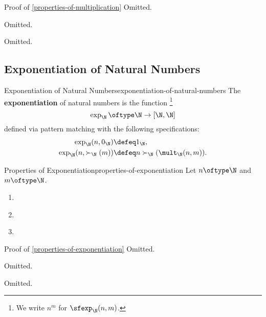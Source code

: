 \begin{Proof}{Proof of \cref{properties-of-multiplication}}%
    Omitted.

    Omitted.

    Omitted.
\end{Proof}
\subsection{Exponentiation of Natural Numbers}\label{subsection-martin-löf-type-theory-exponentiation-of-natural-numbers}
\begin{definition}{Exponentiation of Natural Numbers}{exponentiation-of-natural-numbers}%
    The \textbf{exponentiation} of natural numbers is the function%
    \footnote{%
        We write $n^{m}$ for $\sfexp_{\N}(n,m)$.
        \par\vspace*{\TCBBoxCorrection}
    }%
    \[
        \exp_{\N}%
        \oftype%
        \N%
        \to%
        [\N,\N]%
    \]%
    defined via pattern matching with the following specifications:%
    \begin{align*}
        \exp_{\N}(n,0_{\N})        &\defeq 1_{\N},\\
        \exp_{\N}(n,\succ_{\N}(m)) &\defeq n\succ_{\N}(\mult_{\N}(n,m)).%
    \end{align*}
\end{definition}
\begin{proposition}{Properties of Exponentiation}{properties-of-exponentiation}%
    Let $n\oftype\N$ and $m\oftype\N$.
    \begin{enumerate}
        \item\label{properties-of-exponentiation-unitality}
        \item\label{properties-of-exponentiation-associativity}
        \item\label{properties-of-exponentiation-commutativity}
    \end{enumerate}
\end{proposition}
\begin{Proof}{Proof of \cref{properties-of-exponentiation}}%
    Omitted.

    Omitted.

    Omitted.
\end{Proof}
